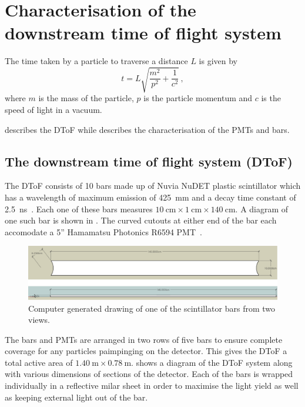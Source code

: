 \chapter{Characterisation of the downstream time of flight system}
\label{ch:hptpc_dtof_characterisation}

The time taken by a particle to traverse a distance $L$ is given by
\begin{equation}
  t = L \sqrt{ \frac{m^{2}}{p^{2}} + \frac{1}{c^{2}} } \, ,
\end{equation}
where $m$ is the mass of the particle, $p$ is the particle momentum and $c$ is the speed of light in a vacuum.

 describes the DToF while  describes the characterisation of the PMTs and bars.

\section{The downstream time of flight system (DToF)}
\label{ch:hptpc_dtof_characterisation:dtof}

The DToF consists of 10 bars made up of Nuvia NuDET plastic scintillator which has a wavelength of maximum emission of \SI{425}{\milli\metre} and a decay time constant of \SI{2.5}{\nano\second}~\cite{nuvia}.
Each one of these bars measures $\SI{10}{\centi\metre} \times \SI{1}{\centi\metre} \times \SI{140}{\centi\metre}$.
A diagram of one such bar is shown in .
The curved cutouts at either end of the bar each accomodate a 5'' Hamamatsu Photonics R6594 PMT~\cite{hamamatsu}.

\begin{figure}
  \centering
  \includegraphics[width=.8\linewidth]{files/figures/hptpc_dtof_characterisation/barDiag}
  \caption[HPTPC DToF bar diagram]{Computer generated drawing of one of the scintillator bars from two views.}
  \label{fig:barDiag}
\end{figure}

The bars and PMTs are arranged in two rows of five bars to ensure complete coverage for any particles paimpinging on the detector.
This gives the DToF a total active area of $\SI{1.40}{\metre} \times \SI{0.78}{\metre}$.
 shows a diagram of the DToF system along with various dimensions of sections of the detector.
Each of the bars is wrapped individually in a reflective milar sheet in order to maximise the light yield as well as keeping external light out of the bar.


